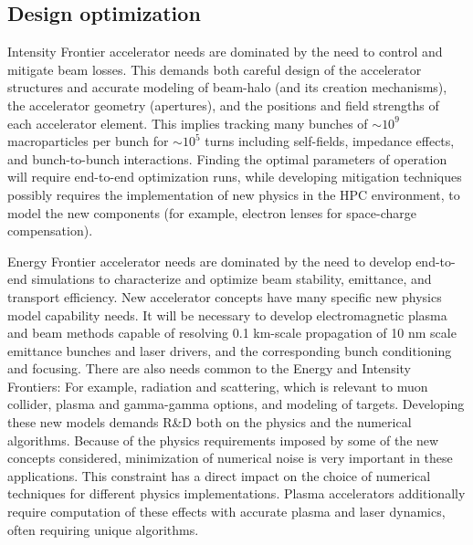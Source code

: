 \subsection{Design optimization}
Intensity Frontier accelerator needs are dominated by the need to
control and mitigate beam losses.  This demands both careful
design of the accelerator structures and accurate modeling of
beam-halo (and its creation mechanisms), the accelerator
geometry (apertures), and the positions and field strengths of each accelerator 
element.  This implies tracking many bunches of $\sim 10^9$
macroparticles per bunch for $\sim 10^5$ turns including
self-fields, impedance effects, and bunch-to-bunch interactions.
Finding the optimal parameters of operation will require
end-to-end  optimization runs, while developing mitigation
techniques possibly requires the implementation of new physics in the HPC
environment, to model the new components (for example, electron
lenses for space-charge compensation). 

Energy Frontier accelerator needs are dominated by the need to
develop end-to-end simulations to characterize and optimize beam
stability, emittance, and transport efficiency.  New
accelerator concepts have many specific new physics model
capability needs. It will be necessary to develop electromagnetic
plasma and beam methods capable of resolving 0.1 km-scale
propagation of 10 nm scale emittance bunches and laser drivers,
and the corresponding bunch conditioning and focusing. 
There are also needs common to the Energy and Intensity Frontiers:
For example, radiation and
scattering, which is relevant to muon collider, plasma and
gamma-gamma options, and modeling of targets.
Developing these new models
demands R\&D both on the physics and the numerical algorithms.
Because of the physics requirements imposed by some of the new
concepts considered, minimization of numerical noise is very
important in these applications.  This constraint has a direct
impact on the choice of numerical techniques for different
physics implementations.  Plasma accelerators additionally require 
computation of these effects with accurate plasma and laser dynamics,
 often requiring unique algorithms.


